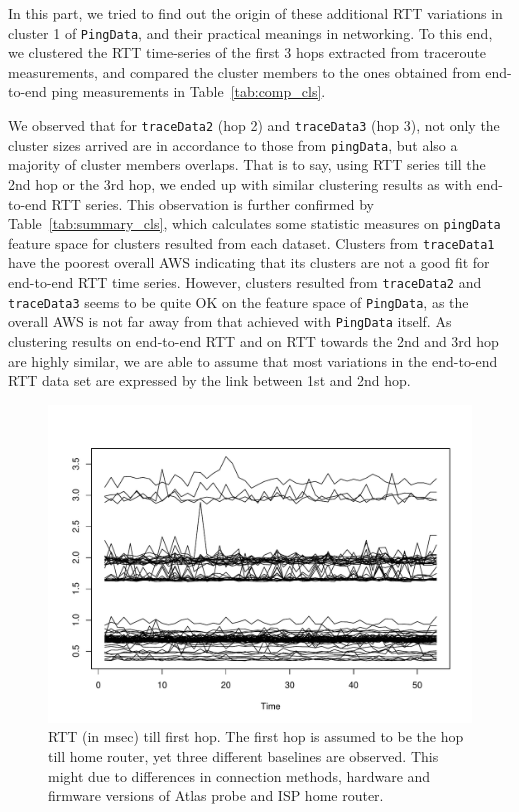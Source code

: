 In this part, we tried to find out the origin of these additional RTT variations in cluster 1 of \texttt{PingData}, and their practical meanings in networking.
To this end, we clustered the RTT time-series of the first 3 hops extracted from traceroute measurements, and compared the cluster members to the ones obtained from end-to-end ping measurements in Table~\ref{tab:comp_cls}.

We observed that for \texttt{traceData2} (hop 2) and \texttt{traceData3} (hop 3), not only the cluster sizes arrived are in accordance to those from \texttt{pingData}, but also a majority of cluster members overlaps. 
That is to say, using RTT series till the 2nd hop or the 3rd hop, we ended up with similar clustering results as with end-to-end RTT series. 
This observation is further confirmed by Table~\ref{tab:summary_cls}, which calculates some statistic measures on \texttt{pingData} feature space for clusters resulted from each dataset. 
Clusters from \texttt{traceData1} have the poorest overall AWS indicating that its clusters are not a good fit for end-to-end RTT time series. 
However, clusters resulted from \texttt{traceData2} and \texttt{traceData3} seems to be quite OK on the feature space of \texttt{PingData}, as the overall AWS is not far away from that achieved with \texttt{PingData} itself.
As clustering results on end-to-end RTT and on RTT towards the 
2nd and 3rd hop are highly similar, we are able to assume that most variations in the end-to-end RTT data set are expressed by the link between 1st and 2nd hop.

\begin{figure}[!htb]
\centering
\includegraphics[width=\textwidth]{gfx/chap3/trace1_cls2_traceRTT.pdf}
\caption{RTT (in msec) till first hop. The first hop is assumed to be the hop till home router, yet three different baselines are observed. This might due to differences in connection methods, hardware and firmware versions of Atlas probe and ISP home router.}
\label{fig:trace1_traceRTT}
\end{figure}


